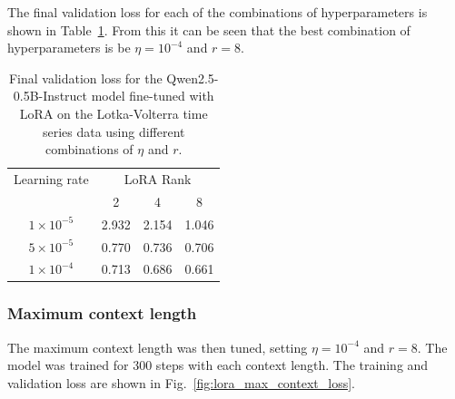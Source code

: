 \documentclass[11pt,a4paper]{article}
\begin{document}
The final validation loss for each of the combinations of hyperparameters is shown in Table~\ref{tab:lora_lr_rank}. From this it can be seen that the best combination of hyperparameters is be $\eta = 10^{-4}$ and $r=8$.

\begin{table}
    \centering
    \begin{tabular}{c|c|c|c}
        Learning rate & \multicolumn{3}{|c}{LoRA Rank} \\
        & 2 & 4 & 8 \\
        \hline
        $1 \times 10^{-5}$ & 2.932 & 2.154 & 1.046 \\
        $5 \times 10^{-5}$ & 0.770 & 0.736 & 0.706 \\
        $1 \times 10^{-4}$ & 0.713 & 0.686 & 0.661 \\
    \end{tabular}
    \caption{Final validation loss for the Qwen2.5-0.5B-Instruct model fine-tuned with LoRA on the Lotka-Volterra time series data using different combinations of $\eta$ and $r$.}
    \label{tab:lora_lr_rank}
\end{table}
\clearpage
\subsubsection{Maximum context length}
\label{sec:max_ctx}
The maximum context length was then tuned, setting $\eta = 10^{-4}$ and $r=8$. The model was trained for 300 steps with each context length. The training and validation loss are shown in Fig.~\ref{fig:lora_max_context_loss}. 
\end{document}
